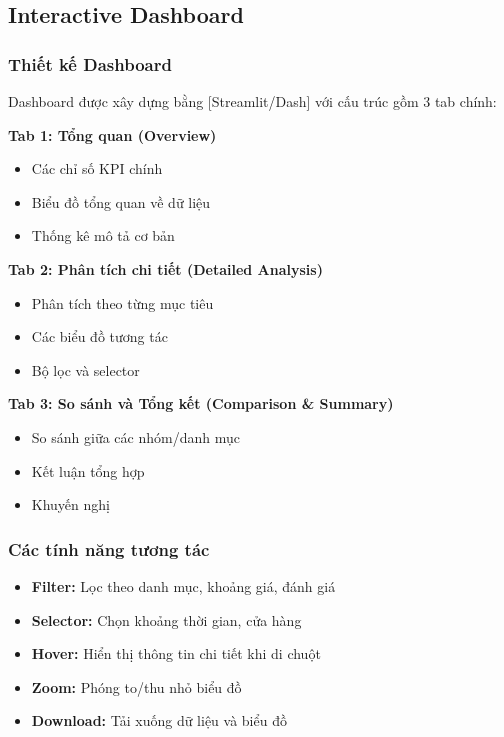 \subsection{Interactive Dashboard}

\subsubsection{Thiết kế Dashboard}

Dashboard được xây dựng bằng [Streamlit/Dash] với cấu trúc gồm 3 tab chính:

\textbf{Tab 1: Tổng quan (Overview)}
\begin{itemize}
    \item Các chỉ số KPI chính
    \item Biểu đồ tổng quan về dữ liệu
    \item Thống kê mô tả cơ bản
\end{itemize}

\textbf{Tab 2: Phân tích chi tiết (Detailed Analysis)}
\begin{itemize}
    \item Phân tích theo từng mục tiêu
    \item Các biểu đồ tương tác
    \item Bộ lọc và selector
\end{itemize}

\textbf{Tab 3: So sánh và Tổng kết (Comparison \& Summary)}
\begin{itemize}
    \item So sánh giữa các nhóm/danh mục
    \item Kết luận tổng hợp
    \item Khuyến nghị
\end{itemize}

\subsubsection{Các tính năng tương tác}

\begin{itemize}
    \item \textbf{Filter:} Lọc theo danh mục, khoảng giá, đánh giá
    \item \textbf{Selector:} Chọn khoảng thời gian, cửa hàng
    \item \textbf{Hover:} Hiển thị thông tin chi tiết khi di chuột
    \item \textbf{Zoom:} Phóng to/thu nhỏ biểu đồ
    \item \textbf{Download:} Tải xuống dữ liệu và biểu đồ
\end{itemize}

